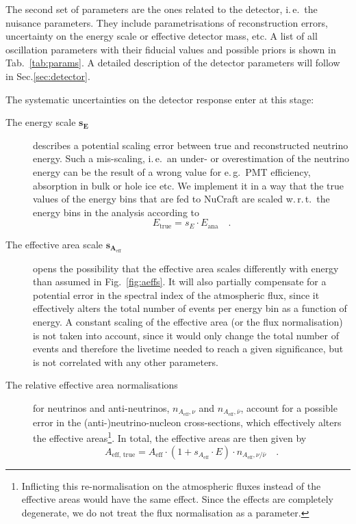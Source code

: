The second set of parameters are the ones related to the detector, i.\,e.\ the
nuisance parameters. They include parametrisations of reconstruction errors,
uncertainty on the energy scale or effective detector mass, etc.  A list of all
oscillation parameters with their fiducial values and possible priors is shown
in Tab.~\ref{tab:params}. A detailed description of the detector parameters
will follow in Sec.\ref{sec:detector}.



The systematic uncertainties on the detector response enter at this stage:
\begin{description}
 \item[The energy scale $\mathbf{s_E}$] describes a potential scaling error
  between true and reconstructed neutrino energy. Such a mis-scaling, i.\,e.\
  an under- or overestimation of the neutrino energy can be the result of a
  wrong value for e.\,g.\ PMT efficiency, absorption in bulk or hole ice etc.
  We implement it in a way that the true values of the energy bins that are fed
  to NuCraft are scaled w.\,r.\,t.\ the energy bins in the analysis according to
  \begin{equation}
   E_\mathrm{true} = s_E\cdot E_\mathrm{ana}\quad.
  \end{equation}

%

 \item[The effective area scale $\mathbf{s_{A_\mathrm{eff}}}$] opens the
  possibility that the effective area scales differently with energy than
  assumed in Fig.~\ref{fig:aeffs}. It will also partially compensate for a
  potential error in the spectral index of the atmospheric flux, since it
  effectively alters the total number of events per energy bin as a function of
  energy. A constant scaling of the effective area (or the flux normalisation)
  is not taken into account, since it would only change the total number of
  events and therefore the livetime needed to reach a given significance, but is
  not correlated with any other parameters.

 \item[The relative effective area normalisations] for neutrinos
  and anti-neutrinos, $n_{A_\mathrm{eff},\nu}$ and $n_{A_\mathrm{eff},\bar\nu}$,
  account for a possible error in the (anti-)neutrino-nucleon cross-sections,
  which effectively alters the effective areas\footnote{Inflicting this
  re-normalisation on the atmospheric fluxes instead of the effective areas
  would have the same effect. Since the effects are completely degenerate, we do
  not treat the flux normalisation as a parameter.}. In total, the effective
  areas are then given by
  \begin{equation}
   A_\mathrm{eff,\,true} = A_\mathrm{eff}
                           \cdot\left(1+s_{A_\mathrm{eff}}\cdot E\right)
                           \cdot n_{A_\mathrm{eff},\nu/\bar\nu}\quad.
  \end{equation}
\end{description}
